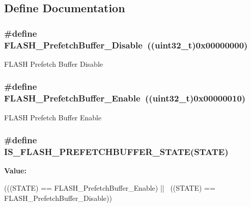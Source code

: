 \subsection{Define Documentation}
\hypertarget{group__Prefetch__Buffer__Enable__Disable_ga2feb631ad85449f83517f05aaf4ba26c}{
\subsubsection[{FLASH\_\-PrefetchBuffer\_\-Disable}]{\setlength{\rightskip}{0pt plus 5cm}\#define FLASH\_\-PrefetchBuffer\_\-Disable~((uint32\_\-t)0x00000000)}}
\label{group__Prefetch__Buffer__Enable__Disable_ga2feb631ad85449f83517f05aaf4ba26c}
FLASH Prefetch Buffer Disable \hypertarget{group__Prefetch__Buffer__Enable__Disable_gad0fac43d078a77794f22840f326a6ed9}{
\subsubsection[{FLASH\_\-PrefetchBuffer\_\-Enable}]{\setlength{\rightskip}{0pt plus 5cm}\#define FLASH\_\-PrefetchBuffer\_\-Enable~((uint32\_\-t)0x00000010)}}
\label{group__Prefetch__Buffer__Enable__Disable_gad0fac43d078a77794f22840f326a6ed9}
FLASH Prefetch Buffer Enable \hypertarget{group__Prefetch__Buffer__Enable__Disable_ga5fd6932c4f4e157a1d6e73d433df092f}{
\subsubsection[{IS\_\-FLASH\_\-PREFETCHBUFFER\_\-STATE}]{\setlength{\rightskip}{0pt plus 5cm}\#define IS\_\-FLASH\_\-PREFETCHBUFFER\_\-STATE(STATE)}}
\label{group__Prefetch__Buffer__Enable__Disable_ga5fd6932c4f4e157a1d6e73d433df092f}
{\bfseries Value:}
\begin{DoxyCode}
(((STATE) == FLASH_PrefetchBuffer_Enable) || \
                                              ((STATE) == 
      FLASH_PrefetchBuffer_Disable))
\end{DoxyCode}
